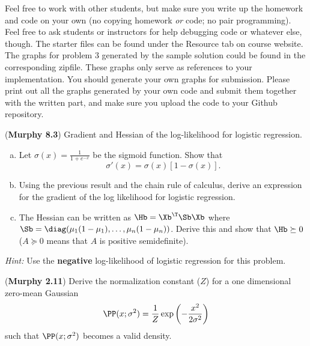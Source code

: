 \documentclass[12pt,letterpaper]{hmcpset}
\begin{document}
Feel free to work with other students, but make sure you write up the homework
and code on your own (no copying homework \textit{or} code; no pair programming).
Feel free to ask students or instructors for help debugging code or whatever else,
though.
\newline
\newline
The starter files can be found under the Resource tab on course website. The graphs for problem 3 generated by the sample solution could be found in the corresponding zipfile. These graphs only serve as references to your implementation. You should generate your own graphs for submission. Please print out all the graphs generated by your own code and submit them together with the written part, and make sure you upload the code to your Github repository.\\

\begin{problem}[1]
	(\textbf{Murphy 8.3}) Gradient and Hessian of the log-likelihood for
	logistic regression.
	\begin{enumerate}[(a)]
		\item Let $\sigma(x) = \frac{1}{1 + e^{-x}}$ be the sigmoid function. Show that
		      \[
			      \sigma'(x) = \sigma(x)\left[1 - \sigma(x)\right].
		      \]
		\item Using the previous result and the chain rule of calculus, derive an
		      expression for the gradient of the log likelihood for logistic regression.
		\item The Hessian can be written as $\Hb=\Xb^\T\Sb\Xb$ where $\Sb =
			      \diag(\mu_1(1-\mu_1), \dots, \mu_n(1-\mu_n))$. Derive this and show that
		      $\Hb \succeq 0$ ($A \succeq 0$ means that $A$ is positive semidefinite).\\
	\end{enumerate}

	\textit{Hint:} Use the \textbf{negative} log-likelihood of logistic regression for this problem.
\end{problem}
\begin{solution}
	\vfill
\end{solution}
\newpage

\begin{problem}[2]
	(\textbf{Murphy 2.11})
	Derive the normalization constant ($Z$) for a one dimensional
	zero-mean Gaussian
	\[
		\PP(x; \sigma^2) = \frac{1}{Z}\exp\left(-\frac{x^2}{2\sigma^2}\right)
	\]
	such that $\PP(x; \sigma^2)$ becomes a valid density.
\end{problem}
\begin{solution}
	\vfill
\end{solution}
\newpage
\end{document}

